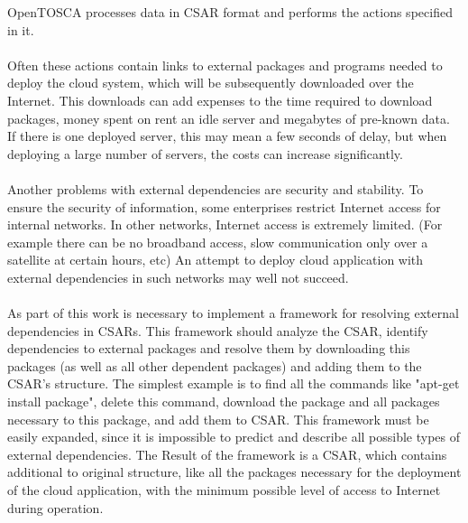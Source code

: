 OpenTOSCA processes data in CSAR format and performs the actions specified in it.\\\\
Often these actions contain links to external packages and programs needed to deploy the cloud system, which will be subsequently downloaded over the Internet.
This downloads can add expenses to the time required to download packages, money spent on rent an idle server and megabytes of pre-known data.
If there is one deployed server, this may mean a few seconds of delay, but when deploying a large number of servers, the costs can increase significantly.\\\\
Another problems with external dependencies are security and stability.
To ensure the security of information, some enterprises restrict Internet access for internal networks.
In other networks, Internet access is extremely limited.
(For example there can be no broadband access, slow communication only over a satellite at certain hours, etc)
An attempt to deploy cloud application with external dependencies in such networks may well not succeed. \\\\
As part of this work is necessary to implement a framework for resolving external dependencies in CSARs.
This framework should analyze the CSAR, identify dependencies to external packages and resolve them by downloading this packages (as well as all other dependent packages) and adding them to the CSAR's structure.
The simplest example is to find all the commands like "apt-get install package", delete this command, download the package and all packages necessary to this package, and add them to CSAR.
This framework must be easily expanded, since it is impossible to predict and describe all possible types of external dependencies.
The Result of the framework is a CSAR, which contains additional to original structure, like all the packages necessary for the deployment of the cloud application, with the minimum possible level of access to Internet during operation.

